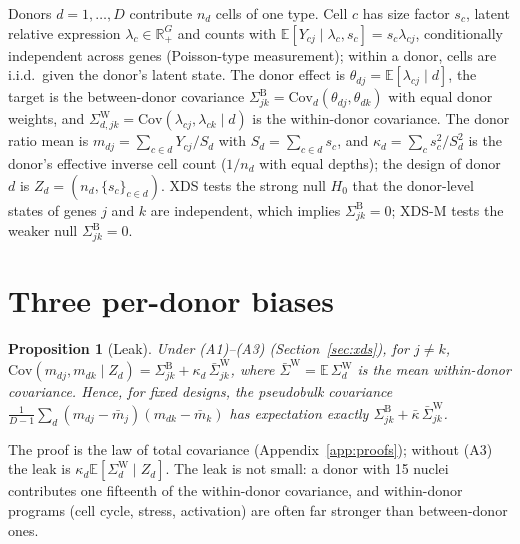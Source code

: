 \documentclass[10pt,letterpaper]{article}
\newtheorem{proposition}{Proposition}
\theoremstyle{definition}
\theoremstyle{remark}
\newcommand{\SB}{\Sigma^{\mathrm{B}}}
\newcommand{\SW}{\Sigma^{\mathrm{W}}}
\newcommand{\E}{\mathbb{E}}
\newcommand{\Cov}{\mathrm{Cov}}
\begin{document}
Donors $d=1,\dots,D$ contribute $n_d$ cells of one type. Cell $c$ has size factor $s_c$, latent relative expression $\lambda_{c}\in\mathbb{R}^G_{+}$ and counts with $\E[Y_{cj}\mid \lambda_c,s_c]=s_c\lambda_{cj}$, conditionally independent across genes (Poisson-type measurement); within a donor, cells are i.i.d.\ given the donor's latent state. The donor effect is $\theta_{dj}=\E[\lambda_{cj}\mid d]$, the target is the between-donor covariance $\SB_{jk}=\Cov_d(\theta_{dj},\theta_{dk})$ with equal donor weights, and $\SW_{d,jk}=\Cov(\lambda_{cj},\lambda_{ck}\mid d)$ is the within-donor covariance. The donor ratio mean is $m_{dj}=\sum_{c\in d}Y_{cj}/S_d$ with $S_d=\sum_{c\in d}s_c$, and $\kappa_d=\sum_c s_c^2/S_d^2$ is the donor's effective inverse cell count ($1/n_d$ with equal depths); the design of donor $d$ is $Z_d=(n_d,\{s_c\}_{c\in d})$. XDS tests the strong null $H_0$ that the donor-level states of genes $j$ and $k$ are independent, which implies $\SB_{jk}=0$; XDS-M tests the weaker null $\SB_{jk}=0$.

\section{Three per-donor biases}\label{sec:bias}

\begin{proposition}[Leak]\label{prop:leak}
Under (A1)--(A3) (Section~\ref{sec:xds}), for $j\neq k$, $\Cov(m_{dj},m_{dk}\mid Z_d)=\SB_{jk}+\kappa_d\,\bar\Sigma^{\mathrm W}_{jk}$, where $\bar\Sigma^{\mathrm W}=\E\,\SW_d$ is the mean within-donor covariance. Hence, for fixed designs, the pseudobulk covariance $\frac1{D-1}\sum_d(m_{dj}-\bar m_j)(m_{dk}-\bar m_k)$ has expectation exactly $\SB_{jk}+\bar\kappa\,\bar\Sigma^{\mathrm W}_{jk}$.
\end{proposition}

The proof is the law of total covariance (Appendix~\ref{app:proofs}); without (A3) the leak is $\kappa_d\E[\SW_d\mid Z_d]$. The leak is not small: a donor with 15 nuclei contributes one fifteenth of the within-donor covariance, and within-donor programs (cell cycle, stress, activation) are often far stronger than between-donor ones.
\end{document}
